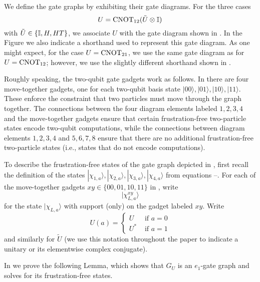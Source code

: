 \documentclass[../thesis-main/thesis-main]{subfiles}
\begin{document}
We define the gate graphs by exhibiting their gate diagrams. For the three cases
\[
  U=\mathrm{CNOT}_{12}(\tilde U\otimes\mathbb{I})
\]
with $\tilde U\in\{\mathbb{I},H,HT\}$, we associate $U$ with the gate diagram shown in . In the Figure we also indicate a shorthand used to represent this gate diagram. As one might expect, for the case $U=\mathrm{CNOT}_{21}$, we use the same gate diagram as for $U=\mathrm{CNOT}_{12}$; however, we use the slightly different shorthand shown in .

Roughly speaking, the two-qubit gate gadgets work as follows. In  there are four move-together gadgets, one for each two-qubit basis state $|00\rangle, |01\rangle, |10\rangle, |11\rangle$. These enforce the constraint that two particles must move through the graph together. The connections between the four diagram elements labeled $1,2,3,4$ and the move-together gadgets ensure that certain frustration-free two-particle states encode two-qubit computations, while the connections between diagram elements $1,2,3,4$ and $5,6,7,8$ ensure that there are no additional frustration-free two-particle states (i.e., states that do not encode computations).

To describe the frustration-free states of the gate graph depicted in , first recall the definition of the states $|\chi_{1,a}\rangle, |\chi_{2,a}\rangle, |\chi_{3,a}\rangle, |\chi_{4,a}\rangle$ from equations --. For each of the move-together gadgets $xy\in\{00,01,10,11\}$ in , write 
\[
|\chi_{L,a}^{xy}\rangle
\]
for the state $|\chi_{L,a}\rangle$ with support (only) on the gadget labeled $xy$. Write 
\[
U(a)=\begin{cases}
U & \text{ if }a=0\\
U^{*} & \text{ if }a=1
\end{cases}
\]
and similarly for $\tilde U$ (we use this notation throughout the paper to indicate a unitary or its elementwise complex conjugate).

In 
we prove the following Lemma, which shows that $G_{U}$ is an $e_{1}$-gate
graph and solves for its frustration-free states.
\end{document}
